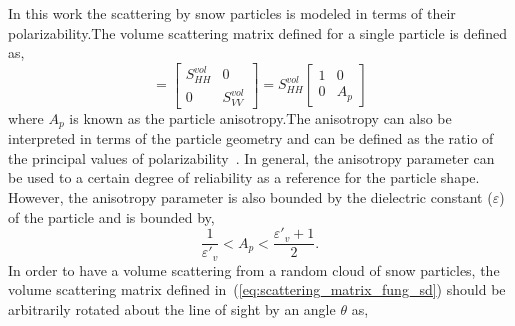 In this work the scattering by snow particles is modeled in terms of their polarizability.The volume scattering matrix defined for a single particle is defined as,
\begin{equation}
	[S_{vol}]=\left[\begin{array}{cc}
		S_{HH}^{vol} & 0 \\
		0 & S_{VV}^{vol}
	\end{array}\right] = S_{HH}^{vol}\left[\begin{array}{cc}
	1 & 0 \\
	0 & A_{p}
\end{array}\right]
\label{eq:scattering_matrix_fung_sd}
\end{equation}
where $A_{p}$ is known as the particle anisotropy.The anisotropy can also be interpreted in terms of the particle geometry and can be defined as the ratio of the principal values of polarizability~\cite{cloude2009polarisation}. In general, the anisotropy parameter can be used to a certain degree of reliability as a reference for the particle shape. However, the anisotropy parameter is also bounded by the dielectric constant ($\varepsilon$) of the particle and is bounded by,
\begin{equation}
	\frac{1}{\varepsilon{'}_{v}}<A_{p}<\frac{\varepsilon{'}_{v} + 1}{2}.
	\label{eq:anisotropy_sd}
\end{equation}
In order to have a volume scattering from a random cloud of snow particles, the volume scattering matrix defined in~(\ref{eq:scattering_matrix_fung_sd}) should be arbitrarily rotated about the line of sight by an angle $\theta$ as,

